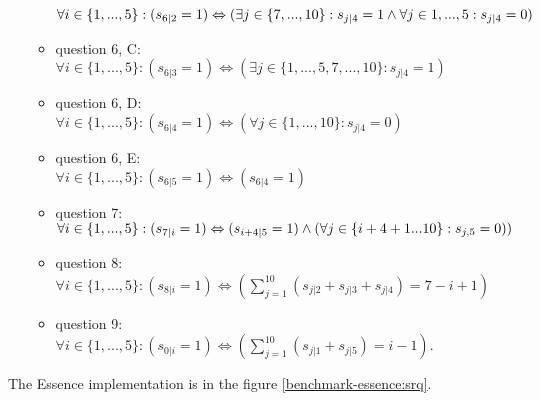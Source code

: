 \begin{itemize}
\begin{itemize}
      $\forall i \in \{1,...,5\}: (s_{6|2} = 1) \Leftrightarrow (\exists j \in \{7,...,10\}: s_{j|4} = 1 \wedge \forall j \in {1,...,5}: s_{j|4} = 0)$
    \item question 6, C: \\
      $\forall i \in \{1,...,5\}: (s_{6|3} = 1) \Leftrightarrow (\exists j \in \{1,...,5,7,...,10\}: s_{j|4} = 1)$
    \item question 6, D: \\
      $\forall i \in \{1,...,5\}: (s_{6|4} = 1) \Leftrightarrow (\forall j \in \{1,...,10\}: s_{j|4} = 0)$
    \item question 6, E: \\
      $\forall i \in \{1,...,5\}: (s_{6|5} = 1) \Leftrightarrow (s_{6|4} = 1)$
    \item question 7: \\
      $\forall i \in \{1,...,5\}: (s_{7|i} = 1) \Leftrightarrow (s_{i+4|5} = 1) \wedge ( \forall j \in \{i+4+1...10\}: s_{j,5} = 0 ) )$
    \item question 8: \\
      $\forall i \in \{1,...,5\}: (s_{8|i} = 1) \Leftrightarrow \left(\sum_{j=1}^{10}{\left(s_{j|2} + s_{j|3} + s_{j|4}\right)} = 7-i+1 \right)$
    \item question 9: \\
      $\forall i \in \{1,...,5\}: (s_{0|i} = 1) \Leftrightarrow \left(\sum_{j=1}^{10}{\left(s_{j|1} + s_{j|5}\right)} = i-1 \right)$. 
   \end{itemize}
	\end{itemize}
The Essence implementation is in the figure \ref{benchmark-essence:srq}.

